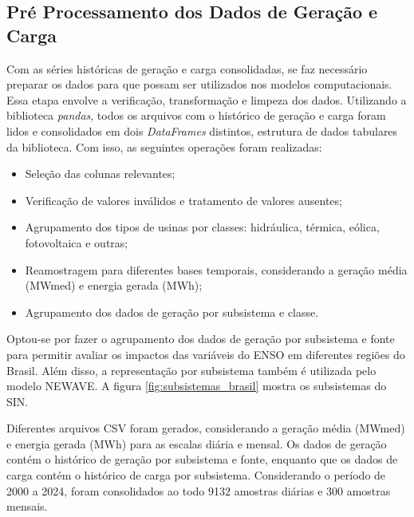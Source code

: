 \subsection{Pré Processamento dos Dados de Geração e Carga} %
Com as séries históricas de geração e carga consolidadas, se faz necessário preparar os dados para que possam ser utilizados 
nos modelos computacionais. Essa etapa envolve a verificação, transformação e limpeza dos dados. Utilizando a biblioteca
\textit{pandas}, todos os arquivos com o histórico de geração e carga foram lidos e consolidados em dois \textit{DataFrames} 
distintos, estrutura de dados tabulares da biblioteca. Com isso, as seguintes operações foram realizadas:
\begin{itemize}
    \item Seleção das colunas relevantes;
    \item Verificação de valores inválidos e tratamento de valores ausentes;
    \item Agrupamento dos tipos de usinas por classes: hidráulica, térmica, eólica, fotovoltaica e outras;
    \item Reamostragem para diferentes bases temporais, considerando a geração média (MWmed) e energia gerada (MWh);
    \item Agrupamento dos dados de geração por subsistema e classe.
\end{itemize}

\begin{figure}[!ht]
	{}
	{}
\end{figure}

Optou-se por fazer o agrupamento dos dados de geração por subsistema e fonte para permitir avaliar os impactos das variáveis
do ENSO em diferentes regiões do Brasil. Além disso, a representação por subsistema também é utilizada pelo modelo NEWAVE. 
A figura \ref{fig:subsistemas_brasil} mostra os subsistemas do SIN.

Diferentes arquivos CSV foram gerados, considerando a geração média (MWmed) e energia gerada (MWh) para as escalas diária e mensal.
Os dados de geração contém o histórico de geração por subsistema e fonte, enquanto que os dados de carga contém o histórico de carga
por subsistema. Considerando o período de 2000 a 2024, foram consolidados ao todo 9132 amostras diárias e 300 amostras mensais.

